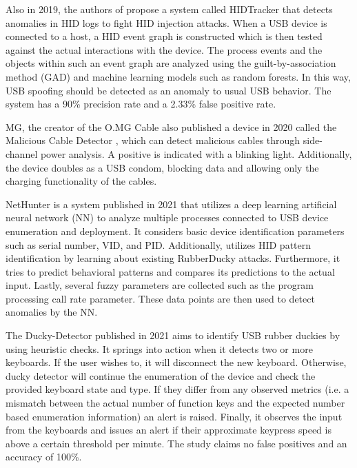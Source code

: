 Also in 2019, the authors of \cite{IdentifyingHIDbasedAttacks2019} propose a system called HIDTracker that detects anomalies in HID logs to fight HID injection attacks. When a USB device is connected to a host, a HID event graph is constructed which is then tested against the actual interactions with the device. The process events and the objects within such an event graph are analyzed using the guilt-by-association method (GAD) and machine learning models such as random forests. In this way, USB spoofing should be detected as an anomaly to usual USB behavior. The system has a 90\% precision rate and a 2.33\% false positive rate. 

MG, the creator of the O.MG Cable also published a device in 2020 called the Malicious Cable Detector \cite{hak5MaliciousCableDetector}, which can detect malicious cables through side-channel power analysis. A positive is indicated with a blinking light. Additionally, the device doubles as a USB condom, blocking data and allowing only the charging functionality of the cables. 

NetHunter \cite{IntelligentSystemPreventing} is a system published in 2021 that utilizes a deep learning artificial neural network (NN) to analyze multiple processes connected to USB device enumeration and deployment. It considers basic device identification parameters such as serial number, VID, and PID. Additionally, utilizes HID pattern identification by learning about existing RubberDucky attacks. Furthermore, it tries to predict behavioral patterns and compares its predictions to the actual input. Lastly, several fuzzy parameters are collected such as the program processing call rate parameter. These data points are then used to detect anomalies by the NN.


The Ducky-Detector \cite{USBRubberDucky2021} published in 2021 aims to identify USB rubber duckies by using heuristic checks. It springs into action when it detects two or more keyboards. If the user wishes to, it will disconnect the new keyboard. Otherwise, ducky detector will continue the enumeration of the device and check the provided keyboard state and type. If they differ from any observed metrics (i.e. a mismatch between the actual number of function keys and the expected number based enumeration information) an alert is raised. Finally, it observes the input from the keyboards and issues an alert if their approximate keypress speed is above a certain threshold per minute. The study claims no false positives and an accuracy of 100\%. 


